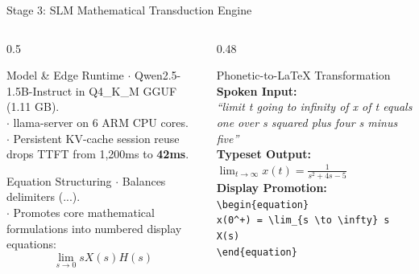 \documentclass[aspectratio=169,10pt]{beamer}
\begin{document}
\begin{frame}{Stage 3: SLM Mathematical Transduction Engine}
  \begin{columns}[T]
    \begin{column}{0.5\textwidth}
      \begin{block}{Model \& Edge Runtime}
        \footnotesize
        $\cdot$ Qwen2.5-1.5B-Instruct in Q4\_K\_M GGUF (1.11 GB).\\
        $\cdot$ llama-server on 6 ARM CPU cores.\\
        $\cdot$ Persistent KV-cache session reuse drops TTFT from 1,200ms to \textbf{42ms}.
      \end{block}
      \begin{block}{Equation Structuring}
        \footnotesize
        $\cdot$ Balances delimiters ($...$).\\
        $\cdot$ Promotes core mathematical formulations into numbered display equations:
        \[ \lim_{s \to 0} s X(s) H(s) \]
      \end{block}
    \end{column}
    \begin{column}{0.48\textwidth}
      \begin{block}{Phonetic-to-LaTeX Transformation}
        \footnotesize
        \textbf{Spoken Input:}\\
        \textit{``limit t going to infinity of x of t equals one over s squared plus four s minus five''}\\[0.5em]
        \textbf{Typeset Output:}\\
        $\lim_{t \to \infty} x(t) = \frac{1}{s^2 + 4s - 5}$\\[0.5em]
        \textbf{Display Promotion:}\\
        \texttt{\textbackslash begin\{equation\}}\\
        \texttt{\quad x(0\textasciicircum+) = \textbackslash lim\_\{s \textbackslash to \textbackslash infty\} s X(s)}\\
        \texttt{\textbackslash end\{equation\}}
      \end{block}
    \end{column}
  \end{columns}
\end{frame}
\end{document}
